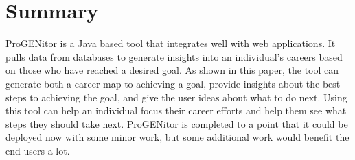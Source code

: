 \section{Summary}
\label{sect:summary}
ProGENitor is a Java based tool that integrates well with web applications.  It
pulls data from databases to generate insights into an individual's careers
based on those who have reached a desired goal.  As shown in this paper, the tool can
generate both a career map to achieving a goal, provide insights about the best
steps to achieving the goal, and give the user ideas about what to do next. 
Using this tool can help an individual focus their career efforts and help them
see what steps they should take next.  ProGENitor is completed to a point that
it could be deployed now with some minor work, but some additional work would
benefit the end users a lot.
